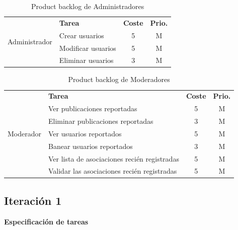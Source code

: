 \begin{table}[H]
    \centering
    \begin{tabular}{|c|p{8cm}|c|c|} \hline 
         \multirow[c]{4}{*}{Administrador}&  \textbf{Tarea}&  \textbf{Coste}& \textbf{Prio.}\\  \cline{2-4}
         &  Crear usuarios &  5& M\\ \cline{2-4}
         &  Modificar usuarios &  5& M\\ \cline{2-4}
         &  Eliminar usuarios &  3& M\\ \hline

         
         
    \end{tabular}
    \caption{Product backlog de Administradores}
    \label{tab:pb_administradores}
\end{table}

\begin{table}[H]
    \centering
    \begin{tabular}{|c|p{8cm}|c|c|} \hline 
         \multirow[c]{7}{*}{Moderador}&  \textbf{Tarea}&  \textbf{Coste}& \textbf{Prio.}\\  \cline{2-4}
         &  Ver publicaciones reportadas &  5& M\\ \cline{2-4}
         &  Eliminar publicaciones reportadas &  3& M\\ \cline{2-4}

         &  Ver usuarios reportados &  5& M\\ \cline{2-4}
         &  Banear usuarios reportados &  3& M\\ \cline{2-4}
         
         &  Ver lista de asociaciones recién registradas &  5& M\\ \cline{2-4}
         &  Validar las asociaciones recién registradas& 5 & M\\ \hline

         
         
    \end{tabular}
    \caption{Product backlog de Moderadores}
    \label{tab:pb_moderadores}
\end{table}

\subsection{Iteración 1}

\large{\textbf{Especificación de tareas}} \\


